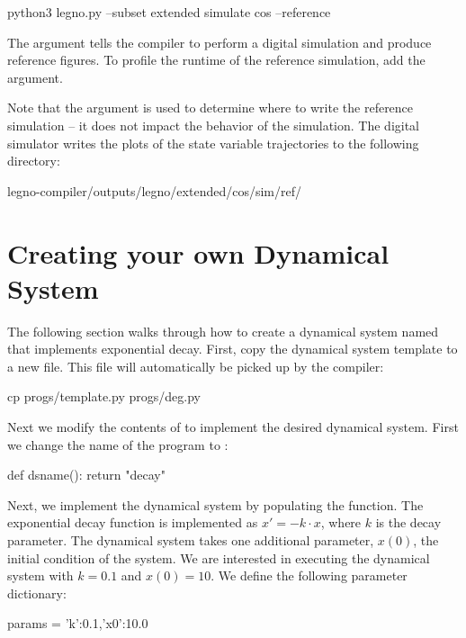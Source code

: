 \begin{snippet}
  python3 legno.py --subset extended simulate cos --reference
\end{snippet}

The  argument tells the compiler to perform a digital
simulation and produce reference figures. To profile the runtime of the
reference simulation, add the  argument.

Note that the  argument is used to determine where to write the reference
simulation -- it does not impact the behavior of the simulation. The digital simulator
writes the plots of the state variable trajectories to the following directory:

\begin{snippet}
  legno-compiler/outputs/legno/extended/cos/sim/ref/
\end{snippet}


\section{Creating your own Dynamical System}

The following section walks through how to create a dynamical system named
 that implements exponential decay. First, copy the dynamical system
template to a new file. This file will automatically be picked up by the compiler:

\begin{snippet}
  cp progs/template.py progs/deg.py
\end{snippet}

Next we modify the contents of  to implement the desired dynamical
system. First we change the name of the program to :

\begin{dssnippet}
def dsname():
   return "decay"
\end{dssnippet}

Next, we implement the dynamical system by populating the  function.
The exponential decay function is implemented as $x' = -k \cdot x$, where $k$
is the decay parameter. The dynamical system takes one additional parameter,
$x(0)$, the initial condition of the system. We are interested in executing the
dynamical system with $k=0.1$ and $x(0) = 10$. We define the following parameter
dictionary:

\begin{dssnippet}
  params = {'k':0.1,'x0':10.0}
\end{dssnippet}


